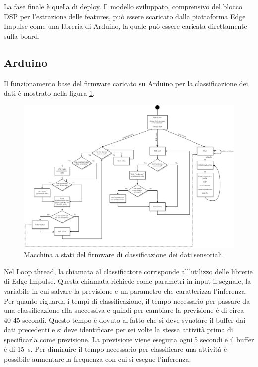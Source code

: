 La fase finale è quella di deploy. Il modello sviluppato, comprensivo del blocco DSP per l'estrazione delle features, può essere scaricato dalla piattaforma Edge Impulse come una libreria di Arduino, la quale può essere caricata direttamente sulla board. 


\subsection{Arduino} \label{arduinoSect}
Il funzionamento base del firmware caricato su Arduino per la classificazione dei dati è mostrato nella figura \ref{fig:SM_classif}.
\begin{figure}[tbh]
	\centering
	\includegraphics[width=\linewidth]{./ImageFiles/SM_classification}
	\caption{Macchina a stati del firmware di classificazione dei dati sensoriali.}
	\label{fig:SM_classif}
\end{figure}

\noindent
Nel Loop thread, la chiamata al classificatore corrisponde all'utilizzo delle librerie di Edge Impulse. Questa chiamata richiede come parametri in input il segnale, la variabile in cui salvare la previsione e un parametro che caratterizza l'inferenza. Per quanto riguarda i tempi di classificazione, il tempo necessario per passare da una classificazione alla successiva e quindi per cambiare la previsione è di circa 40-45 secondi. Questo tempo è dovuto al fatto che si deve svuotare il buffer dai dati precedenti e si deve identificare per sei volte la stessa attività prima di specificarla come previsione. La previsione viene eseguita ogni 5 secondi e il buffer è di \SI{15}{\second}. Per diminuire il tempo necessario per classificare una attività è possibile aumentare la frequenza con cui si esegue l'inferenza.